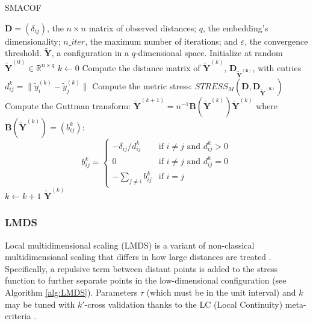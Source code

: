 \begin{algorithm}
    \caption{SMACOF}
    \label{alg:SMACOF}
    
    \begin{algorithmic}[1]
    \REQUIRE $\mathbf{D} = (\delta_{ij})$, the $n\times n$ matrix of observed distances; $q$, the embedding's dimensionality; $n\_iter$, the maximum number of iterations; and $\varepsilon$, the convergence threshold.
    \ENSURE $\boldsymbol{\mathbf{\tilde{Y}}}$, a configuration in a $q$-dimensional space.
    \STATE Initialize at random $\boldsymbol{\mathbf{\tilde{Y}}}^{(0)} \in \mathbb{R}^{n \times q}$
    \STATE $k \leftarrow 0$
    \REPEAT
        \STATE Compute the distance matrix of $\boldsymbol{\mathbf{\tilde{Y}}}^{(k)}$, $\mathbf{D}_{\boldsymbol{\mathbf{\tilde{Y}}^{(k)}}}$, with entries $d_{ij}^k = \|\tilde{y}_i^{(k)} - \tilde{y}_j^{(k)}\|$
        \STATE Compute the metric stress: $STRESS_M( \mathbf{D}, \mathbf{D}_{\boldsymbol{\mathbf{\tilde{Y}}^{(k)}}} )$
        \STATE Compute the Guttman transform: $\boldsymbol{\mathbf{\tilde{Y}}}^{(k+1)} = n^{-1}\mathbf{B}(\boldsymbol{\mathbf{\tilde{Y}}}^{(k)})\boldsymbol{\mathbf{\tilde{Y}}}^{(k)}$ where $\mathbf{B}(\boldsymbol{\mathbf{\tilde{Y}}}^{(k)}) = (b_{ij}^k)$:
        $$
        b_{ij}^k =
        \begin{cases}
        -\delta_{ij}/d_{ij}^k & \text{if } i \neq j \text{ and } d_{ij}^k > 0 \\
        0 & \text{if } i \neq j \text{ and } d_{ij}^k = 0 \\
        -\sum_{j \neq i} b_{ij}^k & \text{if } i = j
        \end{cases}
        $$
        \STATE $k \leftarrow k + 1$
    \RETURN $\boldsymbol{\mathbf{\tilde{Y}}}^{(k)}$
    \end{algorithmic}
\end{algorithm}

\subsubsection{LMDS}

Local multidimensional scaling (LMDS) is a variant of non-classical multidimensional scaling that differs in how large distances are treated \citep{Chen2009}. Specifically, a repulsive term between distant points is added to the stress function to further separate points in the low-dimensional configuration (see Algorithm \ref{alg:LMDS}). Parameters $\tau$ (which must be in the unit interval) and $k$ may be tuned with $k'$-cross validation thanks to the LC (Local Continuity) meta-criteria \citep{Chen2009}.

